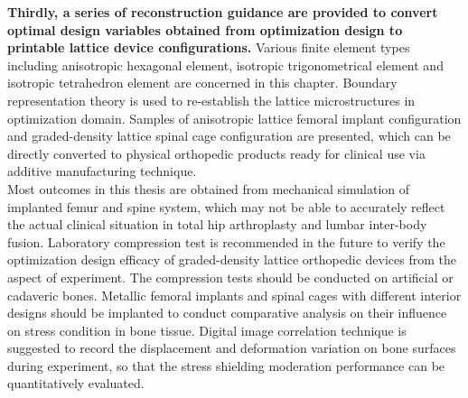 \documentclass[12pt]{extbook}
\begin{document}
{\bf Thirdly, a series of reconstruction guidance are provided to convert optimal design variables obtained from optimization design to printable lattice device configurations.} Various finite element types including anisotropic hexagonal element, isotropic trigonometrical element and isotropic tetrahedron element are concerned in this chapter. Boundary representation theory is used to re-establish the lattice microstructures in optimization domain. Samples of anisotropic lattice femoral implant configuration and graded-density lattice spinal cage configuration are presented, which can be directly converted to physical orthopedic products ready for clinical use via additive manufacturing technique.\\

Most outcomes in this thesis are obtained from mechanical simulation of implanted femur and spine system, which may not be able to accurately reflect the actual clinical situation in total hip arthroplasty and lumbar inter-body fusion. Laboratory compression test is recommended in the future to verify the optimization design efficacy of graded-density lattice orthopedic devices from the aspect of experiment. The compression tests should be conducted on artificial or cadaveric bones. Metallic femoral implants and spinal cages with different interior designs should be implanted to conduct comparative analysis on their influence on stress condition in bone tissue. Digital image correlation technique is suggested to record the displacement and deformation variation on bone surfaces during experiment, so that the stress shielding moderation performance can be quantitatively evaluated.\\
\newpage
\thispagestyle{empty}
~\\
\newpage
\setcounter{page}{1}

 

\end{document}
